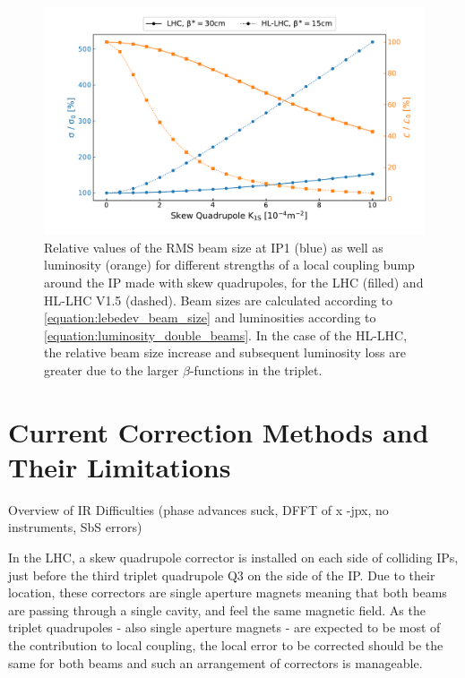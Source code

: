 \begin{figure}[!htb]
    \centering
    \includegraphics*[width=0.99\columnwidth]{Figures/IR_Coupling_Correction/lhc_vs_hllhc_combined.pdf}
    \caption{Relative values of the RMS beam size at IP\num{1} (\textcolor{mplblue}{blue}) as well as luminosity (\textcolor{mplorange}{orange}) for different strengths of a local coupling bump around the IP made with skew quadrupoles, for the LHC (filled) and HL-LHC V1.5 (dashed). Beam sizes are calculated according to \cref{equation:lebedev_beam_size} and luminosities according to \cref{equation:luminosity_double_beams}. In the case of the HL-LHC, the relative beam size increase and subsequent luminosity loss are greater due to the larger \(\beta\)-functions in the triplet.}
    \label{fig:lhc_vs_hllhc_beam_size_and_lumi_growths}
\end{figure}

\section{Current Correction Methods and Their Limitations}

Overview of IR Difficulties (phase advances suck, DFFT of x -jpx, no instruments, SbS errors)

In the LHC, a skew quadrupole corrector is installed on each side of colliding IPs, just before the third triplet quadrupole \(\mathrm{Q3}\) on the side of the IP.
Due to their location, these correctors are single aperture magnets meaning that both beams are passing through a single cavity, and feel the same magnetic field.
As the triplet quadrupoles - also single aperture magnets - are expected to be most of the contribution to local coupling, the local error to be corrected should be the same for both beams and such an arrangement of correctors is manageable.

